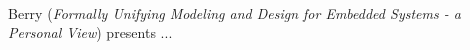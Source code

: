 

\ \hline \ %

Berry
\cite{isola-2016-berry}
({\em Formally Unifying Modeling and Design for
Embedded Systems - a Personal View})
presents ...

